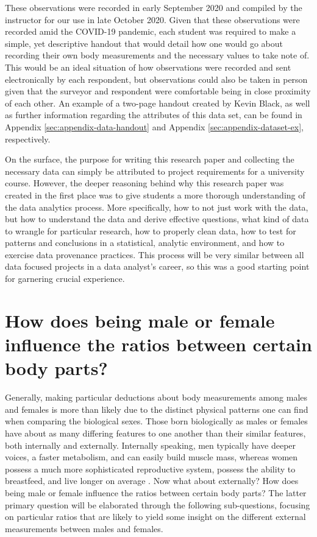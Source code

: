 \documentclass[]{article}
\begin{document}
\vspace{0.25cm}

These observations were recorded in early September 2020 and compiled by
the instructor for our use in late October 2020. Given that these
observations were recorded amid the COVID-19 pandemic, each student was
required to make a simple, yet descriptive handout that would detail how
one would go about recording their own body measurements and the
necessary values to take note of. This would be an ideal situation of
how observations were recorded and sent electronically by each
respondent, but observations could also be taken in person given that
the surveyor and respondent were comfortable being in close proximity of
each other. An example of a two-page handout created by Kevin Black, as
well as further information regarding the attributes of this data set,
can be found in Appendix \ref{sec:appendix-data-handout} and Appendix
\ref{sec:appendix-dataset-ex}, respectively.

\vspace{0.25cm}

On the surface, the purpose for writing this research paper and
collecting the necessary data can simply be attributed to project
requirements for a university course. However, the deeper reasoning
behind why this research paper was created in the first place was to
give students a more thorough understanding of the data analytics
process. More specifically, how to not just work with the data, but how
to understand the data and derive effective questions, what kind of data
to wrangle for particular research, how to properly clean data, how to
test for patterns and conclusions in a statistical, analytic
environment, and how to exercise data provenance practices. This process
will be very similar between all data focused projects in a data
analyst's career, so this was a good starting point for garnering
crucial experience.

\section{How does being male or female influence the ratios between certain body parts?}
\label{sec:rq}

Generally, making particular deductions about body measurements among
males and females is more than likely due to the distinct physical
patterns one can find when comparing the biological sexes. Those born
biologically as males or females have about as many differing features
to one another than their similar features, both internally and
externally. Internally speaking, men typically have deeper voices, a
faster metabolism, and can easily build muscle mass, whereas women
possess a much more sophisticated reproductive system, possess the
ability to breastfeed, and live longer on average
\citep{Wolchover:2011}. Now what about externally? How does being male
or female influence the ratios between certain body parts? The latter
primary question will be elaborated through the following sub-questions,
focusing on particular ratios that are likely to yield some insight on
the different external measurements between males and females.
\end{document}

